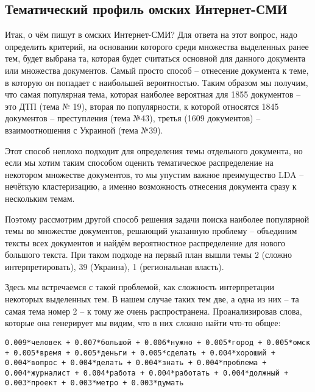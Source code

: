 
\subsection{Тематический профиль омских Интернет-СМИ}
Итак, о чём пишут в омских Интернет-СМИ? Для ответа на этот вопрос, надо определить критерий, на основании которого среди множества выделенных ранее тем, будет выбрана та, которая будет считаться основной для данного документа или множества документов. Самый просто способ -- отнесение документа к теме, в которую он попадает с наибольшей вероятностью. Таким образом мы получим, что самая популярная тема, которая наиболее вероятная для 1855 документов -- это ДТП (тема № 19), вторая по популярности, к которой относятся 1845 документов -- преступления (тема №43), третья (1609 документов) -- взаимоотношения с Украиной (тема №39).
 
Этот способ неплохо подходит для определения темы отдельного документа, но если мы хотим таким способом оценить тематическое распределение на некотором множестве документов, то мы упустим важное преимущество LDA -- нечёткую кластеризацию, а именно возможность отнесения документа сразу к нескольким темам.

Поэтому рассмотрим другой способ решения задачи поиска наиболее популярной темы во множестве документов, решающий указанную проблему -- объединим тексты всех документов и найдём вероятностное распределение для нового большого текста. При таком подходе на первый план вышли темы 2 (сложно интерпретировать), 39 (Украина), 1 (региональная власть).

Здесь мы встречаемся с такой проблемой, как сложность интерпретации некоторых выделенных тем. В нашем случае таких тем две, а одна из них -- та самая тема номер 2 -- к тому же очень распространена. Проанализировав слова, которые она генерирует мы видим, что в них сложно найти что-то общее:

\texttt{0.009*человек + 0.007*большой + 0.006*нужно + 0.005*город + 0.005*омск + 0.005*время + 0.005*деньги + 0.005*сделать + 0.004*хороший + 0.004*вопрос + 0.004*делать + 0.004*знать + 0.004*проблема + 0.004*журналист + 0.004*работа + 0.004*работать + 0.004*должный + 0.003*проект + 0.003*метро + 0.003*думать}


